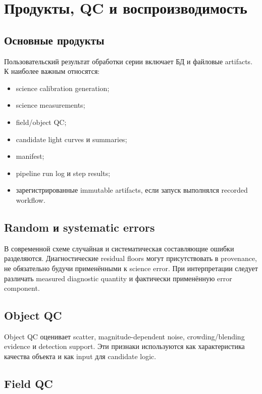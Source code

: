 \chapter{Продукты, QC и воспроизводимость}

\section{Основные продукты}

Пользовательский результат обработки серии включает БД и файловые artifacts. К наиболее важным относятся:

\begin{itemize}
  \item science calibration generation;
  \item science measurements;
  \item field/object QC;
  \item candidate light curves и summaries;
  \item manifest;
  \item pipeline run log и step results;
  \item зарегистрированные immutable artifacts, если запуск выполнялся recorded workflow.
\end{itemize}

\section{Random и systematic errors}

В современной схеме случайная и систематическая составляющие ошибки разделяются. Диагностические residual floors могут присутствовать в provenance, не обязательно будучи применёнными к science error. При интерпретации следует различать measured diagnostic quantity и фактически применённую error component.

\section{Object QC}

Object QC оценивает scatter, magnitude-dependent noise, crowding/blending evidence и detection support. Эти признаки используются как характеристика качества объекта и как input для candidate logic.

\section{Field QC}

